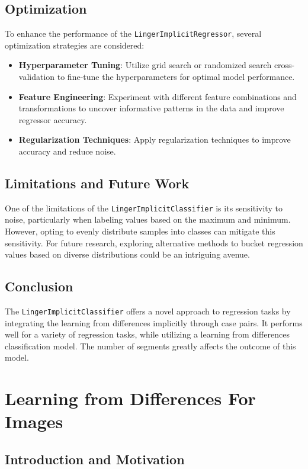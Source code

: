 \documentclass[a4paper, 12pt]{report}
\begin{document}
\subsection{Optimization}
To enhance the performance of the \texttt{LingerImplicitRegressor}, several optimization strategies are considered:
\begin{itemize}
    \item \textbf{Hyperparameter Tuning}: Utilize grid search or randomized search cross-validation to fine-tune the hyperparameters for optimal model performance.
    
    \item \textbf{Feature Engineering}: Experiment with different feature combinations and transformations to uncover informative patterns in the data and improve regressor accuracy.
    
    \item \textbf{Regularization Techniques}: Apply regularization techniques to improve accuracy and reduce noise.
\end{itemize}

\subsection{Limitations and Future Work}
One of the limitations of the \texttt{LingerImplicitClassifier} is its sensitivity to noise, particularly when labeling values based on the maximum and minimum. 
However, opting to evenly distribute samples into classes can mitigate this sensitivity. 
For future research, exploring alternative methods to bucket regression values based on diverse distributions could be an intriguing avenue.

\subsection{Conclusion}
The \texttt{LingerImplicitClassifier} offers a novel approach to regression tasks by integrating the learning from differences implicitly through case pairs. 
It performs well for a variety of regression tasks, while utilizing a learning from differences classification model. The number of segments greatly affects the outcome of this model.

\section{Learning from Differences For Images}
\label{sec:lingerImage_models}
\subsection{Introduction and Motivation}
\end{document}
